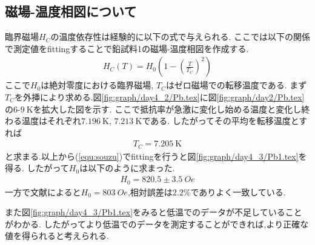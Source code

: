 \subsection{磁場-温度相図について}
臨界磁場$H_C$の温度依存性は経験的に以下の式で与えられる.
ここでは以下の関係で測定値をfittingすることで鉛試料1の磁場-温度相図を作成する.
\begin{align}
  \label{equ:souzu}
  H_C(T)=H_0\left(1-\left(\frac{T}{T_C}\right)^2\right)
\end{align}
ここで$H_0$は絶対零度における臨界磁場,
$T_C$はゼロ磁場での転移温度である.
まず$T_C$を外挿により求める.図\ref{fig:graph/day4_2/Pb.tex}に図\ref{fig:graph/day2/Pb.tex}の$6$-$9\ \si{\kelvin}$を拡大した図を示す.
ここで抵抗率が急激に変化し始める温度と変化し終わる温度はそれぞれ$7.196\ \si{\kelvin}$, $7.213\ \si{\kelvin}$である.
したがってその平均を転移温度とすれば
\begin{align}
  T_C=7.205\ \si{\kelvin}
\end{align}
と求まる.以上から(\ref{equ:souzu})でfittingを行うと図\ref{fig:graph/day4_3/Pb1.tex}を得る.
したがって$H_0$は以下のように求まった.
\begin{align}
  H_0=820.5\pm3.5\ \si{Oe}
\end{align}
一方で文献\cite{kittel}によると$H_0=803\ \si{Oe}$,相対誤差は$2.2\%$でありよく一致している.

また図\ref{fig:graph/day4_3/Pb1.tex}をみると低温でのデータが不足していることがわかる.
したがってより低温でのデータを測定することができれば,より正確な値を得られると考えられる.
